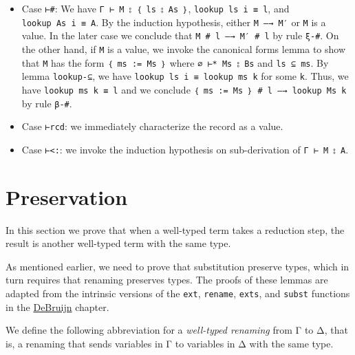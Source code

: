 \begin{itemize}
\item
  Case \texttt{⊢\#}: We have \texttt{Γ\ ⊢\ M\ ⦂\ ｛\ ls\ ⦂\ As\ ｝},
  \texttt{lookup\ ls\ i\ ≡\ l}, and \texttt{lookup\ As\ i\ ≡\ A}. By the
  induction hypothesis, either \texttt{M\ —→\ M′} or \texttt{M} is a
  value. In the later case we conclude that
  \texttt{M\ \#\ l\ —→\ M′\ \#\ l} by rule \texttt{ξ-\#}. On the other
  hand, if \texttt{M} is a value, we invoke the canonical forms lemma to
  show that \texttt{M} has the form \texttt{｛\ ms\ :=\ Ms\ ｝} where
  \texttt{∅\ ⊢*\ Ms\ ⦂\ Bs} and \texttt{ls\ ⊆\ ms}. By lemma
  \texttt{lookup-⊆}, we have \texttt{lookup\ ls\ i\ ≡\ lookup\ ms\ k}
  for some \texttt{k}. Thus, we have \texttt{lookup\ ms\ k\ ≡\ l} and we
  conclude \texttt{｛\ ms\ :=\ Ms\ ｝\ \#\ l\ —→\ lookup\ Ms\ k} by rule
  \texttt{β-\#}.
\item
  Case \texttt{⊢rcd}: we immediately characterize the record as a value.
\item
  Case \texttt{⊢\textless{}:}: we invoke the induction hypothesis on
  sub-derivation of \texttt{Γ\ ⊢\ M\ ⦂\ A}.
\end{itemize}

\hypertarget{preservation}{%
\section{\texorpdfstring{Preservation
}{Preservation }}\label{preservation}}

In this section we prove that when a well-typed term takes a reduction
step, the result is another well-typed term with the same type.

As mentioned earlier, we need to prove that substitution preserve types,
which in turn requires that renaming preserves types. The proofs of
these lemmas are adapted from the intrinsic versions of the
\texttt{ext}, \texttt{rename}, \texttt{exts}, and \texttt{subst}
functions in the \protect\hyperlink{DeBruijn}{DeBruijn} chapter.

We define the following abbreviation for a \emph{well-typed renaming}
from Γ to Δ, that is, a renaming that sends variables in Γ to variables
in Δ with the same type.

